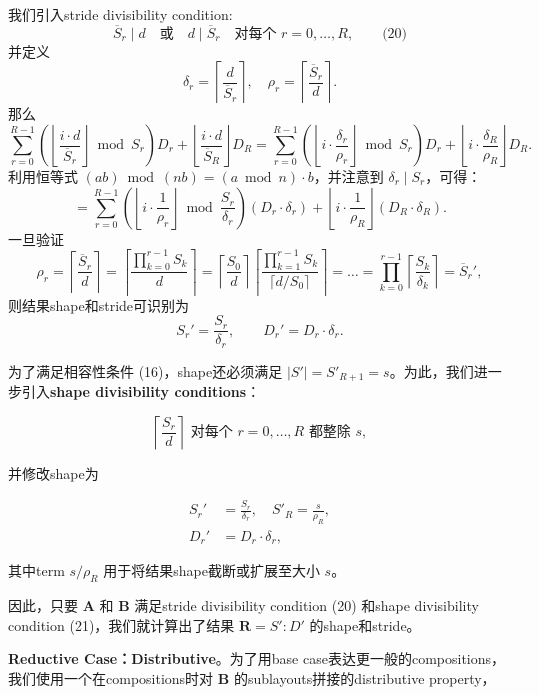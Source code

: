 \documentclass{article}
\begin{document}
我们引入stride divisibility condition:
\[
\overline{S}_r \mid d \quad \text{或} \quad d \mid \overline{S}_r \quad \text{对每个 } r=0,\ldots,R, \qquad \text{(20)}
\]
并定义
\[
\delta_r = \left\lceil \frac{d}{\overline{S}_r} \right\rceil,\quad \rho_r = \left\lceil \frac{\overline{S}_r}{d} \right\rceil.
\]
那么
\[
\sum_{r=0}^{R-1} \left( \left\lfloor \frac{i\cdot d}{\overline{S}_r} \right\rfloor \bmod S_r \right) D_r
   + \left\lfloor \frac{i\cdot d}{\overline{S}_R} \right\rfloor D_R
= \sum_{r=0}^{R-1} \left( \left\lfloor i\cdot \frac{\delta_r}{\rho_r} \right\rfloor \bmod S_r \right) D_r
   + \left\lfloor i\cdot \frac{\delta_R}{\rho_R} \right\rfloor D_R.
\]
利用恒等式 \((ab)\bmod (nb) = (a\bmod n)\cdot b\)，并注意到 \(\delta_r \mid S_r\)，可得：
\[
= \sum_{r=0}^{R-1} \left( \left\lfloor i\cdot \frac{1}{\rho_r} \right\rfloor \bmod \frac{S_r}{\delta_r} \right) (D_r\cdot \delta_r)
   + \left\lfloor i\cdot \frac{1}{\rho_R} \right\rfloor (D_R\cdot \delta_R).
\]
一旦验证
\[
\rho_r = \left\lceil \frac{\overline{S}_r}{d} \right\rceil
      = \left\lceil \frac{\prod_{k=0}^{r-1} S_k}{d} \right\rceil
      = \left\lceil \frac{S_0}{d} \right\rceil \left\lceil \frac{\prod_{k=1}^{r-1} S_k}{\lceil d/S_0\rceil} \right\rceil
      = \dots = \prod_{k=0}^{r-1} \left\lceil \frac{S_k}{\delta_k} \right\rceil = \overline{S}_r',
\]
则结果shape和stride可识别为
\[
S_r' = \frac{S_r}{\delta_r},\qquad D_r' = D_r\cdot \delta_r.
\]

为了满足相容性条件 (16)，shape还必须满足 \(|S'| = S'_{R+1} = s\)。为此，我们进一步引入\textbf{shape divisibility conditions}：

\[
\left\lceil \frac{S_r}{d} \right\rceil \text{ 对每个 } r = 0, \ldots, R \text{ 都整除 } s, \tag{21}
\]

并修改shape为

\[
\begin{aligned}
S_r' &= \frac{S_r}{\delta_r}, \quad S'_R = \frac{s}{\rho_R}, \\
D_r' &= D_r \cdot \delta_r,
\end{aligned}
\]

其中term \( s / \rho_R \) 用于将结果shape截断或扩展至大小 \( s \)。

因此，只要 \(\mathbf{A}\) 和 \(\mathbf{B}\) 满足stride divisibility condition (20) 和shape divisibility condition (21)，我们就计算出了结果 \(\mathbf{R} = S' : D'\) 的shape和stride。

\textbf{Reductive Case：Distributive}。为了用base case表达更一般的compositions，我们使用一个在compositions时对 \(\mathbf{B}\) 的sublayouts拼接的distributive property，
\end{document}
